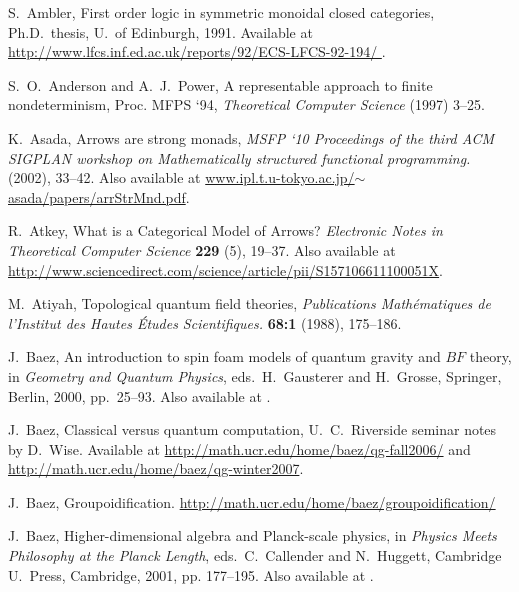 \documentclass[12pt,twoside,openright]{report}
\begin{document}
\begin{thebibliography}{99}
 S.\ Ambler, First order logic in symmetric monoidal closed categories, Ph.D.\ thesis, U.\ of Edinburgh, 1991. Available at 
\href{http://www.lfcs.inf.ed.ac.uk/reports/92/ECS-LFCS-92-194/}{http://www.lfcs.inf.ed.ac.uk/reports/92/ECS-LFCS-92-194/ }.

 S.\ O.\ Anderson and A.\ J.\ Power, A representable approach to finite nondeterminism, Proc. MFPS `94, \textsl{Theoretical Computer Science} (1997) 3--25.

 K.\ Asada, Arrows are strong monads, \textsl{MSFP `10 Proceedings of the third ACM SIGPLAN workshop on Mathematically structured functional programming.} (2002), 33--42.  Also available at \href{http://www.ipl.t.u-tokyo.ac.jp/~asada/papers/arrStrMnd.pdf}{www.ipl.t.u-tokyo.ac.jp/$\sim$asada/papers/arrStrMnd.pdf}.

 R.\ Atkey, What is a Categorical Model of Arrows? \emph{Electronic Notes in Theoretical Computer Science} \textbf{229} (5), 19--37.  Also available at\\ \href{http://www.sciencedirect.com/science/article/pii/S157106611100051X}{http://www.sciencedirect.com/science/article/pii/S157106611100051X}.

 M.\ Atiyah, Topological quantum field theories,
\textsl{Publications Math\'ematiques de l'Institut des Hautes \'Etudes Scientifiques.} \textbf{68:1} (1988), 175--186.

 J.\ Baez, An introduction to spin foam models of quantum gravity and $BF$ theory, in {\sl Geometry and Quantum Physics}, eds.\
H.\ Gausterer and H.\ Grosse, Springer, Berlin, 2000, pp.\ 25--93. Also available at .

 J.\ Baez, Classical versus quantum computation, U.\ C.\ Riverside seminar notes by D.\ Wise.  Available at
\href{http://math.ucr.edu/home/baez/qg-fall2006/index.html#computation}{http://math.ucr.edu/home/baez/qg-fall2006/} and\\ \href{http://math.ucr.edu/home/baez/qg-winter2007/index.html#computation}{http://math.ucr.edu/home/baez/qg-winter2007}.

 J.\ Baez, Groupoidification. \href{http://math.ucr.edu/home/baez/groupoidification/}{http://math.ucr.edu/home/baez/groupoidification/}

 J.\ Baez, Higher-dimensional algebra and Planck-scale physics, in {\sl Physics Meets Philosophy at the Planck Length}, eds.\
C.\ Callender and N.\ Huggett, Cambridge U.\ Press, Cambridge,
2001, pp. 177--195.  Also available at \grqc{9902017}.


\end{thebibliography}
\end{document}
